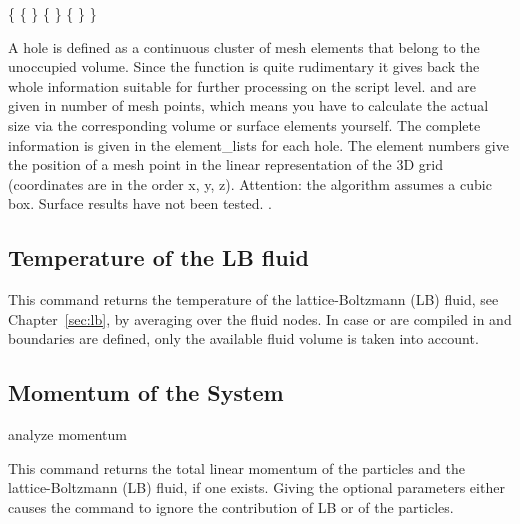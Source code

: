 \begin{code}
\{     
    \{  \}
    \{  \} 
    \{  \} 
\} 
\end{code}

A hole is defined as a continuous cluster of mesh elements that belong
to the unoccupied volume. Since the function is quite rudimentary it
gives back the whole information suitable for further processing on
the script level.  and  are given in number
of mesh points, which means you have to calculate the actual size via
the corresponding volume or surface elements yourself. The complete
information is given in the element_lists for each hole. The element
numbers give the position of a mesh point in the linear representation
of the 3D grid (coordinates are in the order x, y, z). Attention: the
algorithm assumes a cubic box. Surface results have not been tested.
.


\subsection{Temperature of the LB fluid}
\label{analyze:lbtemp}

\begin{essyntax}
  \begin{features}
  \end{features}
\end{essyntax}

This command returns the temperature of the lattice-Boltzmann (LB)
fluid, see Chapter~\ref{sec:lb}, by averaging over the fluid nodes. In
case  or  are
compiled in and boundaries are defined, only the available fluid
volume is taken into account.

\subsection{Momentum of the System}
\label{analyze:momentum}
\begin{pysyntax}
\end{pysyntax}
\begin{essyntax}
    analyze momentum 
\end{essyntax}
This command returns the total linear momentum of the particles and the lattice-Boltzmann (LB) fluid, if one exists. Giving the optional parameters either
causes the command to ignore the contribution of LB or of the particles.

